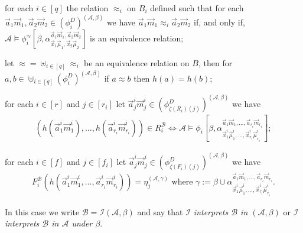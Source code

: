 \documentclass[../main/thesis.tex]{subfiles}
\begin{document}
\begin{definition}
  \begin{myenum}
  \item for each $i \in [q]$ the relation $\approx_i$ on $B_i$ defined such that
    for each $\vec{a}_1\vec{m}_1, \vec{a}_2\vec{m}_2 \in
    (\phi^D_i)^{(\mathcal{A}, \beta)}$ we have $\vec{a}_1\vec{m}_1 \approx_i
    \vec{a}_2\vec{m}_2$ if, and only if, $\mathcal{A} \models
    \phi^{\approx}_i[\beta, \alpha^{\vec{a}_1\vec{m}_1,
      \vec{a}_2\vec{m}_2}_{\vec{x}_1 \vec{\mu}_1, \vec{x}_2 \vec{\mu}_2}]$ is an
    equivalence relation;
  \item let $\approx = \uplus_{i \in [q]}\approx_i$ be an equivalence relation
    on $B$, then for $a , b \in \uplus_{i \in [q]}(\phi^D_i)^{(\mathcal{A},
      \beta)}$ if $a \approx b$ then $h(a) = h(b)$;
  \item for each $i \in [r]$ and $j \in [r_i]$ let $\vec{a}^i_j\vec{m}^i_j \in
    (\phi^D_{\zeta(R_i)(j)})^{(\mathcal{A}, \beta)}$ we have
    \begin{align*}
      (h(\vec{a}^i_1 \vec{m}^i_1) , \ldots , h(\vec{a}^i_{r_i}\vec{m}^i_{r_i}))
      \in R^{\mathcal{B}}_i \iff \mathcal{A} \models \phi_i
      [\beta, \alpha^{\vec{a}_1\vec{m}_1, \ldots, \vec{a}_{r_i} \vec{m}_{r_i}}_{\vec{x}^i_1 \vec{\mu}^i_1 , \ldots, \vec{x}^i_{r_i} \vec{\mu}^i_{r_i}}];
    \end{align*}
  \item for each $i \in [f]$ and $j \in [f_i]$ let $\vec{a}^i_j\vec{m}^i_j \in
    (\phi^D_{\zeta(F_i)(j)})^{(\mathcal{A}, \beta)}$ we have
    \begin{align*}
      F^{\mathcal{B}}_i(h(\vec{a}^i_1 \vec{m}^i_1 , \ldots , \vec{a}^i_{r_i}\vec{m}^i_{r_i})) = \eta^{(\mathcal{A}, \gamma)}_j \text{ where }\gamma := \beta \cup \alpha^{\vec{a}_1\vec{m}_1, \ldots,
      \vec{a}_{r_i} \vec{m}_{r_i}}_{\vec{x}^i_1 \vec{\mu}^i_1 , \ldots,
      \vec{x}^i_{r_i} \vec{\mu}^i_{r_i}}.
    \end{align*}
  \end{myenum}

  In this case we write $\mathcal{B} = \mathcal{I} (\mathcal{A}, \beta)$ and say
  that \emph{$\mathcal{I}$ interprets $\mathcal{B}$ in $(\mathcal{A}, \beta)$}
  or \emph{$\mathcal{I}$ interprets $\mathcal{B}$ in $\mathcal{A}$ under
    $\beta$}.
\end{definition}


\end{document}
